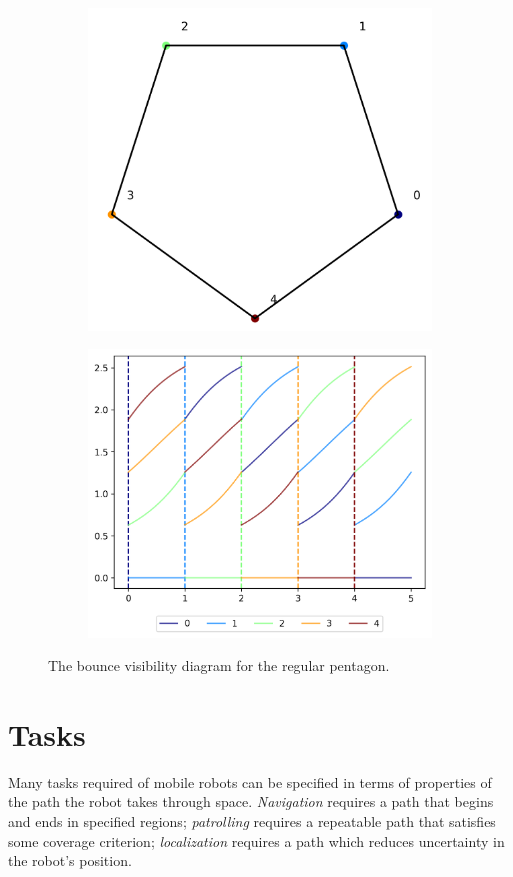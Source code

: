 \documentclass[]{styles/svproc}  %
\begin{document}
\begin{figure}
\centering
\begin{subfigure}{0.35\textwidth}
\centering
\includegraphics[width=0.5\linewidth]{figures/regular_pent.png}
\end{subfigure}%
\begin{subfigure}{0.35\textwidth}
\centering
\includegraphics[width=0.8\linewidth]{figures/regular_pent_bvd.png}
\end{subfigure}
\caption{The bounce visibility diagram for the regular pentagon. }
\label{fig:regular_pent_bvd}
\end{figure}

\section{Tasks}

Many tasks required of mobile robots can be specified in terms of properties of
the path the robot takes through space. \emph{Navigation} requires a path that
begins and ends in specified regions; \emph{patrolling} requires a repeatable
path that satisfies some coverage criterion; \emph{localization} requires a path
which reduces uncertainty in the robot's position.
\end{document}
